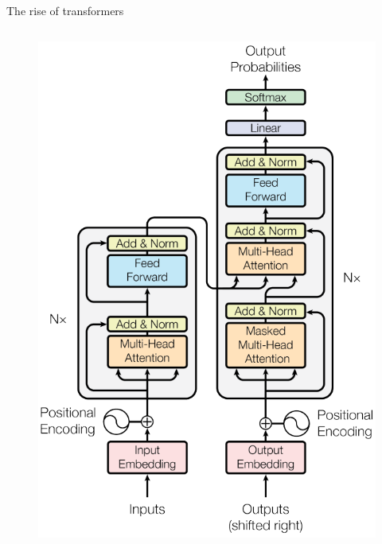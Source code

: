 \documentclass[xcolor=pdftex,dvipsnames,table,mathserif]{beamer}
\begin{document}
\begin{frame}{The rise of transformers}
\begin{columns}
    \begin{column}{.5\textwidth}
      \begin{figure}[ht]
        \centering
        \includegraphics[width=\textwidth]{transformer}
      \end{figure}
    \end{column}

  \end{columns}


\end{frame}
\end{document}
